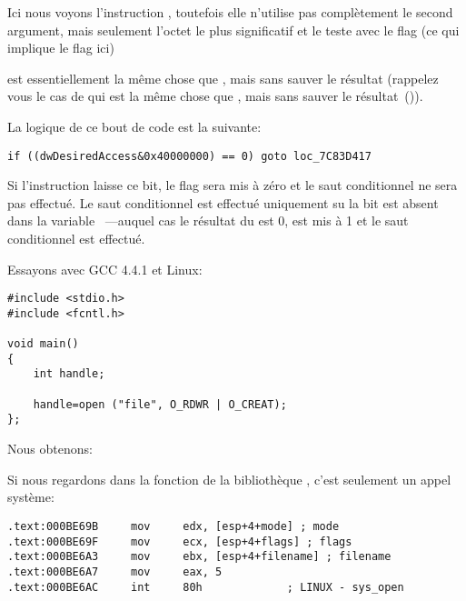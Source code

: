 Ici nous voyons l'instruction \TEST, toutefois elle n'utilise pas complètement le
second argument, mais seulement l'octet le plus significatif et le teste avec le
flag  (ce qui implique le flag  ici)

\TEST est essentiellement la même chose que \AND, mais sans sauver le résultat
(rappelez vous le cas de \CMP qui est la même chose que \SUB, mais sans sauver le
résultat~()).

La logique de ce bout de code est la suivante:

\begin{lstlisting}[style=customc]
if ((dwDesiredAccess&0x40000000) == 0) goto loc_7C83D417
\end{lstlisting}


Si l'instruction \AND laisse ce bit, le flag \ZF sera mis à zéro et le saut conditionnel
\JZ ne sera pas effectué.
Le saut conditionnel est effectué uniquement su la bit  est absent
dans la variable ~---auquel cas le résultat du \AND est 0, \ZF
est mis à 1 et le saut conditionnel est effectué.

Essayons avec GCC 4.4.1 et Linux:

\begin{lstlisting}[style=customc]
#include <stdio.h>
#include <fcntl.h>

void main()
{
	int handle;

	handle=open ("file", O_RDWR | O_CREAT);
};
\end{lstlisting}

Nous obtenons:




Si nous regardons dans la fonction  de la bibliothèque ,
c'est seulement un appel système:

\begin{lstlisting}[caption=open() (libc.so.6),style=customasmx86]
.text:000BE69B     mov     edx, [esp+4+mode] ; mode
.text:000BE69F     mov     ecx, [esp+4+flags] ; flags
.text:000BE6A3     mov     ebx, [esp+4+filename] ; filename
.text:000BE6A7     mov     eax, 5
.text:000BE6AC     int     80h             ; LINUX - sys_open
\end{lstlisting}


